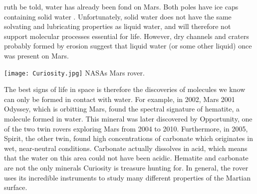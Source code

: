 ruth be told, water has already been fond on Mars.
Both poles have ice caps containing solid water \cite{MARSwater}.
Unfortunately, solid water does not have the same solvating and lubricating properties as liquid water, and will therefore not support molecular processes essential for life.
However, dry channels and craters probably formed by erosion suggest that liquid water (or some other liquid) once was present on Mars.

\begin{center}
	\texttt{[image: Curiosity.jpg]}
	NASAs Mars rover.
\end{center}

The best signs of life in space is therefore the discoveries of molecules we know can only be formed in contact with water.
For example, in 2002, Mars 2001 Odyssey, which is orbitting Mars, found the spectral signature of hematite, a molecule formed in water.
This mineral was later discovered by Opportunity, one of the two twin rovers exploring Mars from 2004 to 2010.
Furthermore, in 2005, Spirit, the other twin, found high concentrations of carbonate which originates in wet, near-neutral conditions. 
Carbonate actually dissolves in acid, which means that the water on this area could not have been acidic.
Hematite and carbonate are not the only minerals Curiosity is treasure hunting for.
In general, the rover uses its incredible instruments to study many different properties of the Martian surface.
